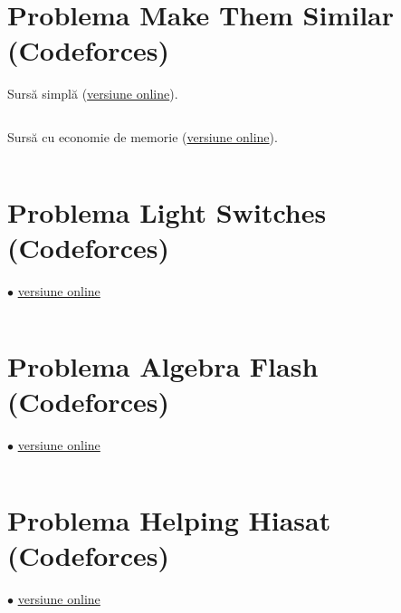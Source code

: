 \documentclass[../main.tex]{subfiles}
\begin{document}
\section{Problema Make Them Similar (Codeforces)}
\label{code:make-them-similar}

Sursă simplă (\href{https://codeforces.com/contest/1257/submission/288352006}{versiune online}).

\inputminted{cpp}{../src/bit-mastery/make-them-similar-1.cpp}

Sursă cu economie de memorie (\href{https://codeforces.com/contest/1257/submission/288363533}{versiune online}).

\inputminted{cpp}{../src/bit-mastery/make-them-similar-2.cpp}

\section{Problema Light Switches (Codeforces)}
\label{code:light-switches}
$\bullet$
\href{https://codeforces.com/contest/1423/submission/287891500}{versiune online}

\inputminted{cpp}{../src/bit-mastery/light-switches.cpp}

\section{Problema Algebra Flash (Codeforces)}
\label{code:algebra-flash}
$\bullet$
\href{https://codeforces.com/contest/1767/submission/288148589}{versiune online}

\inputminted{cpp}{../src/bit-mastery/algebra-flash.cpp}

\section{Problema Helping Hiasat (Codeforces)}
\label{code:helping-hiasat}
$\bullet$
\href{https://codeforces.com/contest/1105/submission/350251768}{versiune online}

\inputminted{cpp}{../src/bit-mastery/helping-hiasat.cpp}
\end{document}
